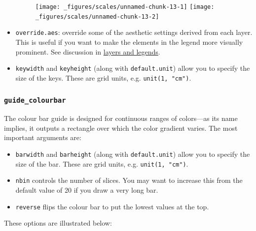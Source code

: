 \begin{itemize}
  \begin{figure}[H]
    \texttt{[image: \_figures/scales/unnamed-chunk-13-1]}%
    \texttt{[image: \_figures/scales/unnamed-chunk-13-2]}
  \end{figure}
\item
  \texttt{override.aes}: override some of the aesthetic settings derived
  from each layer. This is useful if you want to make the elements in
  the legend more visually prominent. See discussion in
  \protect\hyperlink{sub-layers-legends}{layers and legends}.
\item
  \texttt{keywidth} and \texttt{keyheight} (along with
  \texttt{default.unit}) allow you to specify the size of the keys.
  These are grid units, e.g. \texttt{unit(1,\ "cm")}.
\end{itemize}

\subsubsection{\texorpdfstring{\texttt{guide\_colourbar}}{guide\_colourbar}}\label{guideux5fcolourbar}

The colour bar guide is designed for continuous ranges of colors---as
its name implies, it outputs a rectangle over which the color gradient
varies. The most important arguments are: 

\begin{itemize}
\item
  \texttt{barwidth} and \texttt{barheight} (along with
  \texttt{default.unit}) allow you to specify the size of the bar. These
  are grid units, e.g. \texttt{unit(1,\ "cm")}.
\item
  \texttt{nbin} controls the number of slices. You may want to increase
  this from the default value of 20 if you draw a very long bar.
\item
  \texttt{reverse} flips the colour bar to put the lowest values at the
  top.
\end{itemize}

These options are illustrated below:

